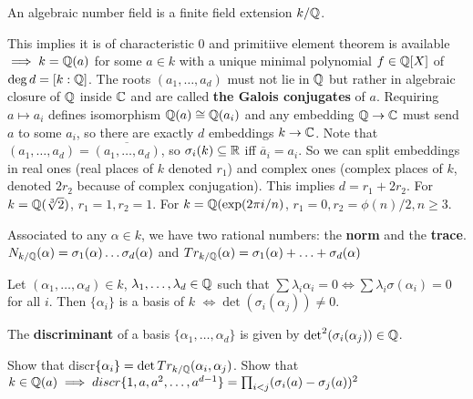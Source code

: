 \begin{outline}
\begin{definition}
    An algebraic number field is a finite field extension $k/\mathbb{Q}$. 
\end{definition}
This implies it is of characteristic 0 and primitiive element theorem is available $\implies k=\mathbb{Q}(a)$ for some $a\in k$ with a unique minimal polynomial $f\in \mathbb{Q}[X]$ of $\deg d = [k:\mathbb{Q}]$.
    \1 The roots $(a_1,\ldots,a_d)$ must not lie in $\mathbb{Q}$ but rather in algebraic closure of $\mathbb{Q}$ inside $\mathbb{C}$ and are called \textbf{the Galois conjugates} of $a$.
    \1 Requiring $a\mapsto a_i$ defines isomorphism $\mathbb{Q}(a)\cong \mathbb{Q}(a_i)$ and any embedding $\mathbb{Q} \rightarrow \mathbb{C}$ must send $a$ to some $a_i$, so there are exactly $d$ embeddings $k\rightarrow \mathbb{C}$.
    \1 Note that $(a_1,\ldots,a_d)=\overline{(a_1,\ldots,a_d)}$, so $\sigma_i(k)\subseteq \mathbb{R}$ iff $\overline{a}_i=a_i$.
        \2 So we can split embeddings in real ones (real places of $k$ denoted $r_1$) and complex ones (complex places of $k$, denoted $2r_2$ because of complex conjugation). This implies $d=r_1+2r_2$.
            \3 For $k=\mathbb{Q}(\sqrt[3]{2})$, $r_1=1, r_2=1$.
            \3 For $k=\mathbb{Q}(\exp(2 \pi i/n)$, $r_1=0, r_2 = \phi(n)/2, n\geq 3$.
\0 \begin{definition}
    Associated to any $\alpha\in k$, we have two rational numbers: the \textbf{norm} and the \textbf{trace}.
    $N_{k/\mathbb{Q}}(\alpha)=\sigma_1(\alpha)\ldots \sigma_d(\alpha)$ and $Tr_{k/\mathbb{Q}}(\alpha)=\sigma_1(\alpha)+\ldots+\sigma_d(\alpha)$
\end{definition} 
Let $(\alpha_1,\ldots,\alpha_d)\in k$, $\lambda_1,\ldots,\lambda_d\in\mathbb{Q}$ such that $\sum \lambda_i\alpha_i = 0 \iff \sum \lambda_i \sigma(\alpha_i)=0$ for all $i$. Then $\{\alpha_i\}$ is a basis of $k$ $\iff \det (\sigma_i(\alpha_j))\neq 0$.

\begin{definition}
    The \textbf{discriminant} of a basis $\{\alpha_1,\ldots,\alpha_d\}$ is given by $\det^2(\sigma_i(\alpha_j))\in\mathbb{Q}$.
\end{definition}
\end{outline}

\begin{exercise}
    Show that discr$\{\alpha_i\}=\det Tr_{k/\mathbb{Q}}(\alpha_i,\alpha_j)$. Show that $k\in \mathbb{Q}(a) \implies discr\{1,a,a^2,\ldots,a^{d-1}\}=\prod_{i<j}(\sigma_i(a)-\sigma_j(a))^2$ 
\end{exercise}


